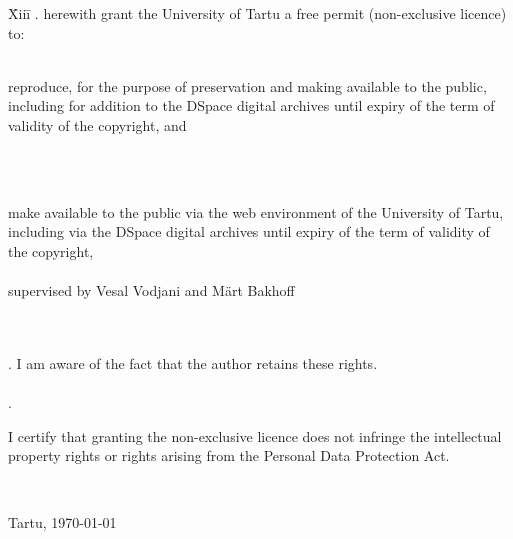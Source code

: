 \documentclass{style/bachelor-thesis}
\begin{document}
\begin{tabbing}
\= Xiii\=\kill
{}. \> herewith grant the University of Tartu a free permit (non-exclusive licence) to:\\\\ 

\> 
\begin{minipage}[t]{14.2cm}
reproduce, for the purpose of preservation and making available to the public, including for addition to the DSpace digital archives until expiry of the term of validity of the copyright, and
\end{minipage}
\\\\
\begin{minipage}[t]{14.2cm}
make available to the public via the web environment of the University of Tartu, including via the DSpace digital archives until expiry of the term of validity of the copyright,\\ 

\articleName\\   

supervised by Vesal Vodjani and Märt Bakhoff

\end{minipage}\\\\ 
. \>I am aware of the fact that the author retains these rights.\\\\
. \>
\begin{minipage}[t]{14.2cm}
I certify that granting the non-exclusive licence does not infringe the intellectual property rights or rights arising from the Personal Data Protection Act. 
\end{minipage}\\
\end{tabbing}

\noindent
Tartu, \today
\end{document}
